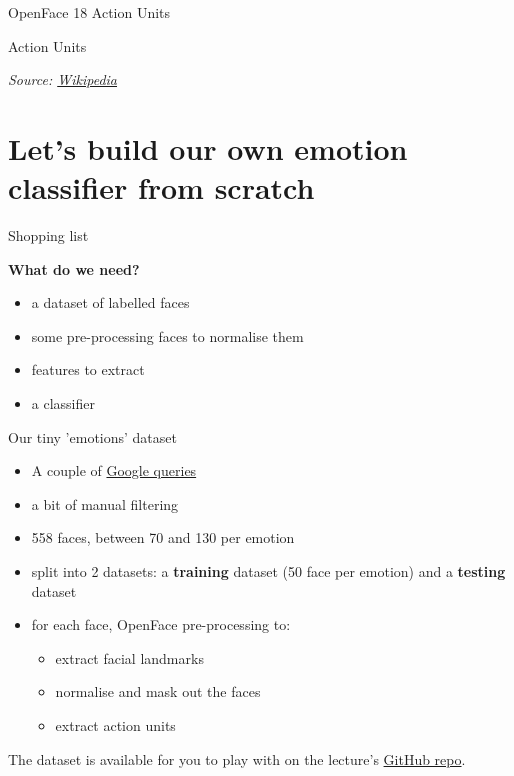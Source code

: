\documentclass[compress]{beamer}
\newcommand{\source}[2]{{\tiny\it Source: \href{#1}{#2}}}
\begin{document}
\begin{frame}{OpenFace 18 Action Units}
\end{frame}

\begin{frame}{Action Units}



\source{https://en.wikipedia.org/wiki/Facial_Action_Coding_System}{Wikipedia}
\end{frame}

\section[Emotion classifier]{Let's build our own emotion classifier from scratch}

\begin{frame}{Shopping list}

    \begin{center}
        {\bf What do we need?}
    \end{center}

    \pause

    \begin{itemize}
        \item<+-> a dataset of labelled faces
        \item<+-> some pre-processing faces to normalise them
        \item<+-> features to extract
        \item<+-> a classifier
    \end{itemize}
\end{frame}


\begin{frame}{Our tiny 'emotions' dataset}
    \begin{itemize}
        \item A couple of \href{https://www.google.co.uk/search?q=human+face+happiness&tbm=isch&source=lnt&tbs=itp:face}{Google queries}
        \item a bit of manual filtering
        \item 558 faces, between 70 and 130 per emotion
        \item split into 2 datasets: a {\bf training} dataset (50 face per
            emotion) and a {\bf testing} dataset
        \item for each face, OpenFace pre-processing to:
            \begin{itemize}
                \item extract facial landmarks
                \item normalise and mask out the faces
                \item extract action units
            \end{itemize}
    \end{itemize}

    The dataset is available for you to play with on the lecture's
    \href{https://github.com/severin-lemaignan/lecture-hri-emotions}{GitHub repo}.
\end{frame}
\end{document}
